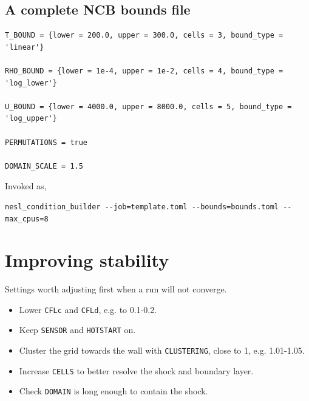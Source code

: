 \documentclass[10pt,a4paper]{article}
\renewcommand{\_}{\origunderscore\penalty4000\relax}
\begin{document}
\subsection*{A complete NCB bounds file}

\begin{lstlisting}
T_BOUND = {lower = 200.0, upper = 300.0, cells = 3, bound_type = 'linear'}

RHO_BOUND = {lower = 1e-4, upper = 1e-2, cells = 4, bound_type = 'log_lower'}

U_BOUND = {lower = 4000.0, upper = 8000.0, cells = 5, bound_type = 'log_upper'}

PERMUTATIONS = true

DOMAIN_SCALE = 1.5
\end{lstlisting}

Invoked as,

\begin{lstlisting}[style=plain]
nesl_condition_builder --job=template.toml --bounds=bounds.toml --max_cpus=8
\end{lstlisting}

\section*{Improving stability}

Settings worth adjusting first when a run will not converge.

\begin{itemize}
    \item Lower \texttt{CFL\_c} and \texttt{CFL\_d}, e.g. to 0.1-0.2.
    \item Keep \texttt{SENSOR} and \texttt{HOT\_START} on.
    \item Cluster the grid towards the wall with \texttt{CLUSTERING}, close to 1, e.g. 1.01-1.05.
    \item Increase \texttt{CELLS} to better resolve the shock and boundary layer.
    \item Check \texttt{DOMAIN} is long enough to contain the shock.
\end{itemize}
\end{document}
